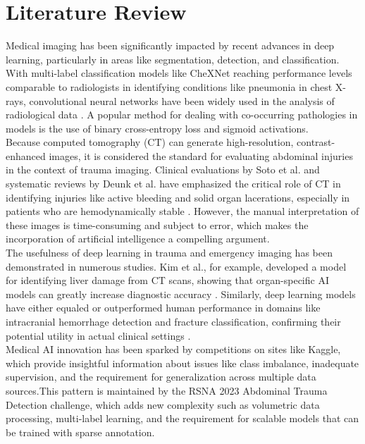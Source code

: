 \documentclass[a4paper,12pt]{article}
\begin{document}
\section{Literature Review}
Medical imaging has been significantly impacted by recent advances in deep learning, particularly in areas like segmentation, detection, and classification. With multi-label classification models like CheXNet reaching performance levels comparable to radiologists in identifying conditions like pneumonia in chest X-rays, convolutional neural networks have been widely used in the analysis of radiological data \cite{rajpurkar2017chexnet}. A popular method for dealing with co-occurring pathologies in models is the use of binary cross-entropy loss and sigmoid activations.\\

Because computed tomography (CT) can generate high-resolution, contrast-enhanced images, it is considered the standard for evaluating abdominal injuries in the context of trauma imaging. Clinical evaluations by Soto et al. and systematic reviews by Deunk et al. have emphasized the critical role of CT in identifying injuries like active bleeding and solid organ lacerations, especially in patients who are hemodynamically stable \cite{deunk2007value,soto2005ct} . However, the manual interpretation of these images is time-consuming and subject to error, which makes the incorporation of artificial intelligence a compelling argument.\\

The usefulness of deep learning in trauma and emergency imaging has been demonstrated in numerous studies. Kim et al., for example, developed a model for identifying liver damage from CT scans, showing that organ-specific AI models can greatly increase diagnostic accuracy \cite{kim2020ai}. Similarly, deep learning models have either equaled or outperformed human performance in domains like intracranial hemorrhage detection and fracture classification, confirming their potential utility in actual clinical settings \cite{chilamkurthy2018deep,olczak2017artificial}. \\

Medical AI innovation has been sparked by competitions on sites like Kaggle, which provide insightful information about issues like class imbalance, inadequate supervision, and the requirement for generalization across multiple data sources.This pattern is maintained by the RSNA 2023 Abdominal Trauma Detection challenge, which adds new complexity such as volumetric data processing, multi-label learning, and the requirement for scalable models that can be trained with sparse annotation.\\
\end{document}
